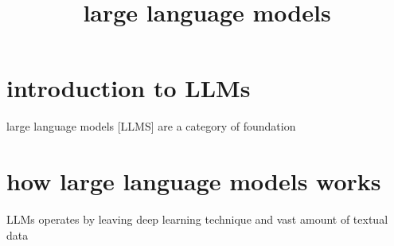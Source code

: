 \documentclass {article}
\title{large language models}
\begin{document}
\maketitle
\section{introduction to LLMs} 
large language models [LLMS] are a category of foundation
\section {how large language models works}
LLMs operates by leaving deep learning technique and vast amount of textual data
\end{document}
